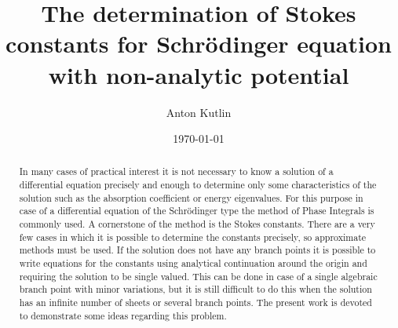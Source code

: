 \documentclass[aps,prl,preprint,superscriptaddress]{revtex4}
\begin{document}

\title{The determination of Stokes constants for Schr\"{o}dinger equation with non-analytic potential}


\author{Anton Kutlin}


\date{\today}

\begin{abstract}
In many cases of practical interest it is not necessary to know a solution of a differential equation precisely and enough to determine only some characteristics of the solution such as the absorption coefficient or energy eigenvalues. For this purpose in case of a differential equation of the Schr\"{o}dinger type the method of Phase Integrals is commonly used. A cornerstone of the method is the Stokes constants. There are a very few cases in which it is possible to determine the constants precisely, so approximate methods must be used. If the solution does not have any branch points it is possible to write equations for the constants using analytical continuation around the origin and requiring the solution to be single valued. This can be done in case of a single algebraic branch point with minor variations, but it is still difficult to do this when the solution has an infinite number of sheets or several branch points. The present work is devoted to demonstrate some ideas regarding this problem.
\end{abstract}
\end{document}
